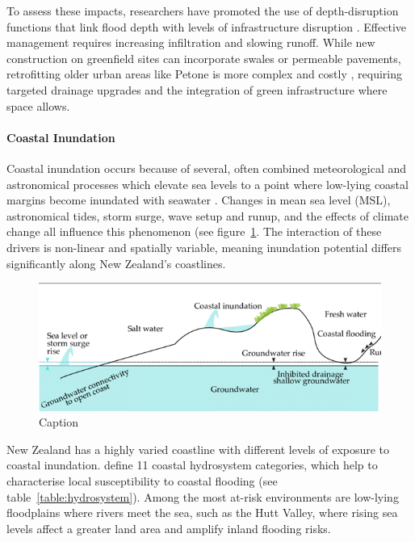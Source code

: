 To assess these impacts, researchers have promoted the use of depth-disruption
functions that link flood depth with levels of infrastructure disruption
\parencite{kalantari2014, paulik2025}. Effective management requires increasing
infiltration and slowing runoff. While new construction on greenfield sites can
incorporate swales or permeable pavements, retrofitting older urban areas like
Petone is more complex and costly \parencite{shafique2017, WWL2022}, requiring
targeted drainage upgrades and the integration of green infrastructure where
space allows.

\paragraph{Coastal Inundation}
Coastal inundation occurs because of several, often combined meteorological and
astronomical processes which elevate sea levels to a point where low-lying
coastal margins become inundated with seawater \parencite{NIWA2023}. Changes in
mean sea level (MSL), astronomical tides, storm surge, wave setup and runup, and
the effects of climate change all influence this phenomenon (see
figure~\ref{fig:inundation}. The interaction of these drivers is non-linear and
spatially variable, meaning inundation potential differs significantly along New
Zealand’s coastlines.

\begin{figure}
    \centering
    \includegraphics[width=1\linewidth]{Content/Figures/02_Literature_Review/inundation.png}
    \caption{Caption}
    \label{fig:inundation}
\end{figure}

New Zealand has a highly varied coastline with different levels of exposure to
coastal inundation. \textcite{hume2016} define 11 coastal hydrosystem
categories, which help to characterise local susceptibility to coastal flooding
(see table~\ref{table:hydrosystem}). Among the most at-risk environments are
low-lying floodplains where rivers meet the sea, such as the Hutt Valley, where
rising sea levels affect a greater land area and amplify inland flooding risks.

